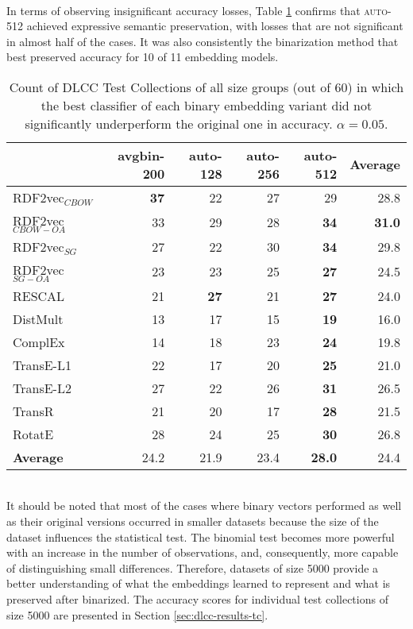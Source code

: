 \documentclass[11pt,titlepage,oneside,openany]{book}
\begin{document}
\\
In terms of observing insignificant accuracy losses, Table \ref{tab:dlcc-significantly-not-worse} confirms that \textsc{auto-512} achieved expressive semantic preservation, with losses that are not significant in almost half of the cases. It was also consistently the binarization method that best preserved accuracy for 10 of 11 embedding models.\\
\begin{table}[h!]
\centering
\begin{tabular}{lrrrrr}
\toprule
{} &  avgbin-200 &  auto-128 &  auto-256 &  auto-512 &  \textbf{Average} \\
\midrule
RDF2vec$_{CBOW}$     &	\textbf{37} &        22  &        27  &        29 & 28.8  \\
RDF2vec$_{CBOW-OA}$  &          33  &        29  &        28  &	\textbf{34} & \textbf{31.0} \\
RDF2vec$_{SG}$       &          27  &        22  &        30  &	\textbf{34} & 29.8 \\
RDF2vec$_{SG-OA}$    &          23  &        23  &        25  &	\textbf{27} & 24.5 \\
RESCAL               &          21  &	\textbf{27} &        21  &	\textbf{27} & 24.0 \\
DistMult             &          13  &        17  &        15  &	\textbf{19} & 16.0 \\
ComplEx              &          14  &        18  &        23  &	\textbf{24} & 19.8 \\
TransE-L1            &          22  &        17  &        20  &	\textbf{25} & 21.0 \\
TransE-L2            &          27  &        22  &        26  &	\textbf{31} & 26.5 \\
TransR               &          21  &        20  &        17  &	\textbf{28} & 21.5 \\
RotatE               &          28  &        24  &        25  &	\textbf{30} & 26.8 \\
\midrule
\textbf{Average}     &        24.2  &      21.9  &      23.4  &	\textbf{28.0} & 24.4 \\
\bottomrule
\end{tabular}
\caption{Count of DLCC Test Collections of all size groups (out of 60) in which the best classifier of each binary embedding variant did not significantly underperform the original one in accuracy. $\alpha=0.05$.}
\label{tab:dlcc-significantly-not-worse}
\end{table}
\\
It should be noted that most of the cases where binary vectors performed as well as their original versions occurred in smaller datasets because the size of the dataset influences the statistical test. The binomial test becomes more powerful with an increase in the number of observations, and, consequently, more capable of distinguishing small differences. Therefore, datasets of size 5000 provide a better understanding of what the embeddings learned to represent and what is preserved after binarized. The accuracy scores for individual test collections of size 5000 are presented in Section \ref{sec:dlcc-results-tc}.
\end{document}
